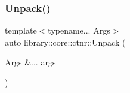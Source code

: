\mbox{\label{namespacelibrary_1_1core_1_1ctnr_aa83e692c1420d325c7602ae7b21d626d}} 
\subsubsection{\texorpdfstring{Unpack()}{Unpack()}}
{\footnotesize\ttfamily template$<$typename... Args$>$ \\
auto library\+::core\+::ctnr\+::\+Unpack (\begin{DoxyParamCaption}\item[{Args \&...}]{args }\end{DoxyParamCaption})}

